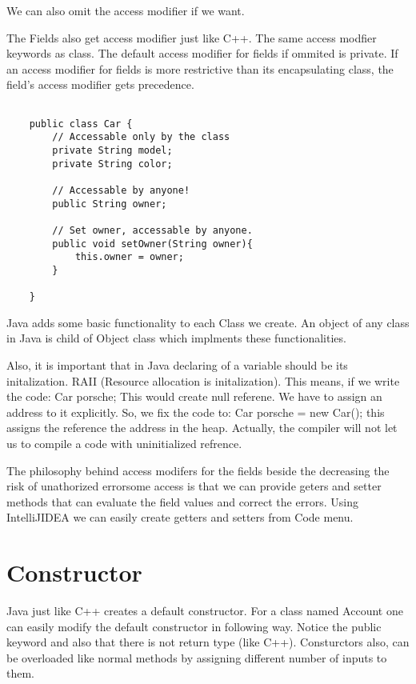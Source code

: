 \documentclass[11pt,twoside,a4paper]{report}
\begin{document}
We can also omit the access modifier if we want.

The Fields also get access modifier just like C++. The same access modfier keywords as class.
The default access modifier for fields if ommited is private. If an access modifier for fields is more restrictive than its encapsulating class,
the field's access modifier gets precedence.
\begin{lstlisting}

    public class Car {
        // Accessable only by the class
        private String model;
        private String color;

        // Accessable by anyone!
        public String owner;

        // Set owner, accessable by anyone.
        public void setOwner(String owner){
            this.owner = owner;
        }

    }

\end{lstlisting}



Java adds some basic functionality to each Class we create. An object of any class in Java is child of Object class which implments these functionalities.

Also, it is important that in Java declaring of a variable should be its initalization. RAII (Resource allocation is initalization).
This means, if we write the code: Car porsche; This would create null referene. We have to assign an address to it explicitly. So, we fix the code to:  Car porsche = new Car();
this assigns the reference the address in the heap. Actually, the compiler will not let us to compile a code with uninitialized refrence.

The philosophy behind access modifers for the fields beside the decreasing the risk of unathorized errorsome access is that we can provide geters and setter methods that can
evaluate the field values and correct the errors. Using IntelliJIDEA we can easily create getters and setters from Code menu.

\section{Constructor}
Java just like C++ creates a default constructor. For a class named Account one can easily modify the default constructor in following way. Notice the public keyword and also that there is not return type (like C++).
Consturctors also, can be overloaded like normal methods by assigning different number of inputs to them.
\end{document}

